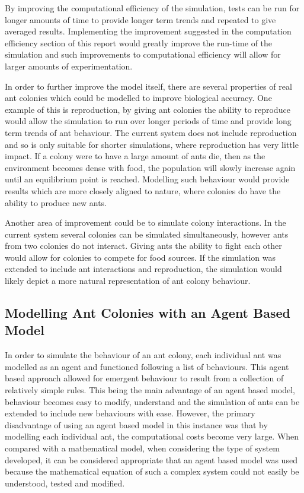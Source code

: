 By improving the computational efficiency of the simulation, tests can be run for longer amounts of time to provide longer term trends and repeated to give averaged results. Implementing the improvement suggested in the computation efficiency section of this report would greatly improve the run-time of the simulation and such improvements to computational efficiency will allow for larger amounts of experimentation.\par
In order to further improve the model itself, there are several properties of real ant colonies which could be modelled to improve biological accuracy. One example of this is reproduction, by giving ant colonies the ability to reproduce would allow the simulation to run over longer periods of time and provide long term trends of ant behaviour. The current system does not include reproduction and so is only suitable for shorter simulations, where reproduction has very little impact. If a colony were to have a large amount of ants die, then as the environment becomes dense with food, the population will slowly increase again until an equilibrium point is reached. Modelling such behaviour would provide results which are more closely aligned to nature, where colonies do have the ability to produce new ants.\par
Another area of improvement could be to simulate colony interactions. In the current system several colonies can be simulated simultaneously, however ants from two colonies do not interact. Giving ants the ability to fight each other would allow for colonies to compete for food sources. If the simulation was extended to include ant interactions and reproduction, the simulation would likely depict a more natural representation of ant colony behaviour.\par

\subsection{Modelling Ant Colonies with an Agent Based Model}
In order to simulate the behaviour of an ant colony, each individual ant was modelled as an agent and functioned following a list of behaviours. This agent based approach allowed for emergent behaviour to result from a collection of relatively simple rules. This being the main advantage of an agent based model, behaviour becomes easy to modify, understand and the simulation of ants can be extended to include new behaviours with ease. However, the primary disadvantage of using an agent based model in this instance was that by modelling each individual ant, the computational costs become very large. When compared with a mathematical model, when considering the type of system developed, it can be considered appropriate that an agent based model was used because the mathematical equation of such a complex system could not easily be understood, tested and modified.  
